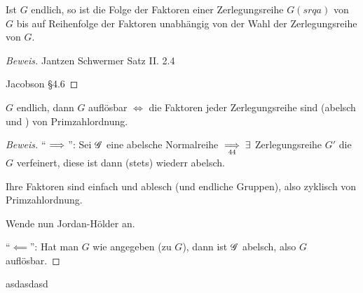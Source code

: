 \documentclass[a4paper]{report}
\begin{document}
\begin{satz}
Ist $G$ endlich, so ist die Folge der Faktoren einer Zerlegungsreihe $G(srqa)$ von $G$ bis auf Reihenfolge der Faktoren unabhängig von der Wahl der Zerlegungsreihe von $G$.
\end{satz}
\begin{proof}[Beweis] %
  \item Jantzen Schwermer Satz II. 2.4
  \item Jacobson §4.6
\end{proof}
\begin{kor} %
$G$ endlich, dann $G$ auflösbar $\iff$ die Faktoren jeder Zerlegungsreihe sind (abelsch und ) von Primzahlordnung.
\end{kor}
\begin{proof}[Beweis]
  \item ``$\implies$'': Sei $\mathscr{G}$ eine abelsche Normalreihe
  \(\underset{44} {\implies} \exists \) Zerlegungsreihe $G'$ die $G$ verfeinert, diese ist dann (stets) wiederr abelsch.

  Ihre Faktoren sind einfach und ablesch (und endliche Gruppen), also zyklisch von Primzahlordnung.

  Wende nun Jordan-Hölder an.

\item ``$\impliedby$'': Hat man $G$ wie angegeben (zu $G$), dann ist $\mathscr{G}$ abelsch, also $G$ auflösbar.
\end{proof}
asdasdasd
\end{document}
